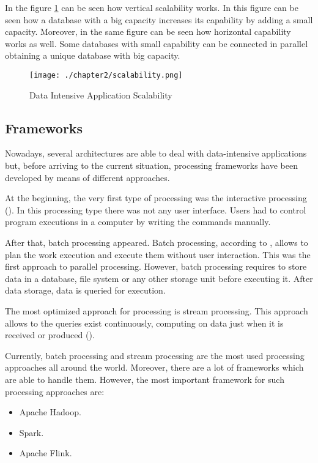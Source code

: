 In the figure \ref{fig:Data Intensive Application Scalability} can be seen how vertical scalability works. In this figure can be seen how a database with a big capacity increases its capability by adding a small capacity. Moreover, in the same figure can be seen how horizontal capability works as well. Some databases with small capability can be connected in parallel obtaining a unique database with big capacity.

\begin{figure}
\centering
{\texttt{[image: ./chapter2/scalability.png]}}
\caption{Data Intensive Application Scalability}
\label{fig:Data Intensive Application Scalability}
\end{figure}

\subsection{Frameworks}

Nowadays, several architectures are able to deal with data-intensive applications but, before arriving to the current situation, processing frameworks have been developed by means of different approaches.

At the beginning, the very first type of processing was the interactive processing (\cite{interactiveprocessing}). In this processing type there was not any user interface. Users had to control program executions in a computer by writing the commands manually.

After that, batch processing appeared. Batch processing, according to \cite{interactiveprocessing}, allows to plan the work execution and execute them without user interaction. This was the first approach to parallel processing. However, batch processing requires to store data in a database, file system or any other storage unit before executing it. After data storage, data is queried for execution.

The most optimized approach for processing is stream processing. This approach allows to the queries exist continuously, computing on data just when it is received or produced (\cite{streamprocessing}).

Currently, batch processing and stream processing are the most used processing approaches all around the world. Moreover, there are a lot of frameworks which are able to handle them. However, the most important framework for such processing approaches are:

\begin{itemize}
\item Apache Hadoop.
\item Spark.
\item Apache Flink.
\end{itemize}

